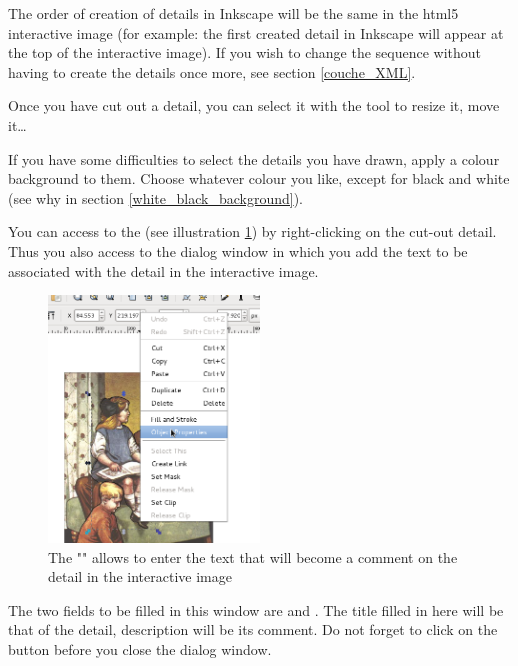 \begin{alerte}
 The order of creation of details in Inkscape will be 
 the same in the html5 interactive image (for example: the first created detail in
Inkscape will appear at the top of the interactive image).
If you wish to change the sequence without having to create the details once more, see 
section \ref{couche_XML}.
\end{alerte}

Once you have cut out a detail, you can select it with the tool  
 to resize it, move it\ldots

\begin{astuce}
If you have some difficulties to select the details you have drawn,
apply a colour background to them. Choose whatever colour you like, except for black and white (see why in section \ref{white_black_background}).
\end{astuce}


You can access to the  (see illustration 
\ref{objet_properties}) by right-clicking on the cut-out detail. Thus you also access to the dialog window in which you add the text to be associated with the 
detail in the interactive image.

\begin{figure}[htp]
 \centering
 \includegraphics[width=0.5\textwidth, clip=true, trim=0mm 60mm 0mm 0mm]{./images/proprietes_objet}
 \caption[The "Object Properties" of the detail in Inkscape]{The "" allows to enter the text that will become a  comment on the detail in the interactive image}
 \label{objet_properties}
\end{figure}

The two fields to be filled in this window are  and 
.  The title filled in here will be that of the detail, 
description will be its comment. Do not forget to click on the 
button before you close the  dialog window.

